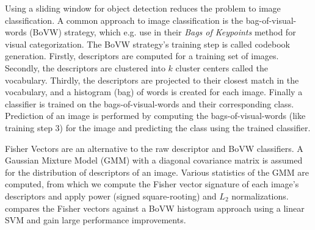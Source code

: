 \documentclass[thesis.tex]{subfiles}
\begin{document}
Using a sliding window for object detection reduces the problem to image classification. A common approach to image classification is the bag-of-visual-words (BoVW) strategy, which e.g. \citet{csurka2004visual} use in their \emph{Bags of Keypoints} method for visual categorization. The BoVW strategy's training step is called codebook generation. Firstly, descriptors are computed for a training set of images. Secondly, the descriptors are clustered into $k$ cluster centers called the vocabulary. Thirdly, the descriptors are projected to their closest match in the vocabulary, and a histogram (bag) of words is created for each image. Finally a classifier is trained on the bags-of-visual-words and their corresponding class. Prediction of an image is performed by computing the bags-of-visual-words (like training step 3) for the image and predicting the class using the trained classifier.

Fisher Vectors \cite{sanchez2013image} are an alternative to the raw descriptor and BoVW classifiers. A Gaussian Mixture Model (GMM) with a diagonal covariance matrix is assumed for the distribution of descriptors of an image. Various statistics of the GMM are computed, from which we compute the Fisher vector signature of each image's descriptors and apply power (signed square-rooting) and $L_2$ normalizations. \citet{sanchez2013image} compares the Fisher vectors against a BoVW histogram approach using a linear SVM and gain large performance improvements.

 

\subbibliography
\end{document}
